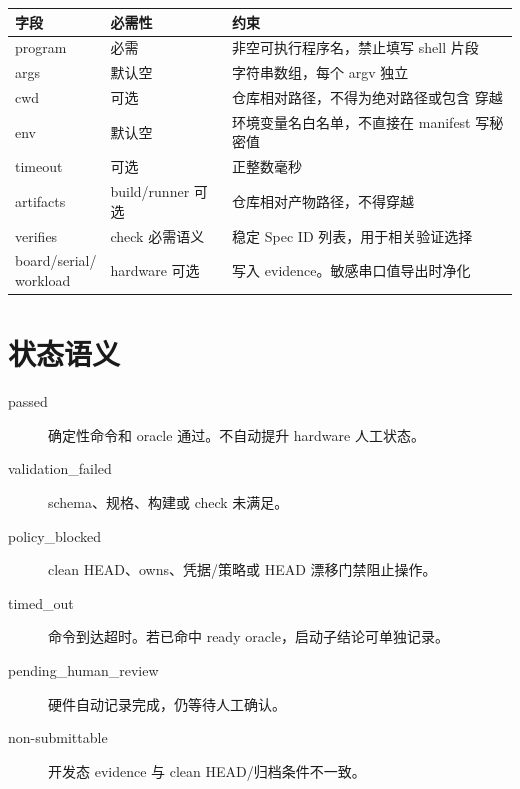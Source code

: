 \begin{table}[htbp]
  \centering
  \begin{tabularx}{\textwidth}{p{3.2cm}p{2.4cm}X}
    \toprule
    字段 & 必需性 & 约束 \\
    \midrule
    program & 必需 & 非空可执行程序名，禁止填写 shell 片段 \\
    args & 默认空 & 字符串数组，每个 argv 独立 \\
    cwd & 可选 & 仓库相对路径，不得为绝对路径或包含 \code{..} 穿越 \\
    env & 默认空 & 环境变量名白名单，不直接在 manifest 写秘密值 \\
    timeout & 可选 & 正整数毫秒 \\
    artifacts & build/runner 可选 & 仓库相对产物路径，不得穿越 \\
    verifies & check 必需语义 & 稳定 Spec ID 列表，用于相关验证选择 \\
    \makecell[l]{board/serial/\\workload} & hardware 可选 & 写入 evidence。敏感串口值导出时净化 \\
    \bottomrule
  \end{tabularx}
\end{table}

\section{状态语义}

\begin{description}
  \item[passed] 确定性命令和 oracle 通过。不自动提升 hardware 人工状态。
  \item[validation\_failed] schema、规格、构建或 check 未满足。
  \item[policy\_blocked] clean HEAD、owns、凭据/策略或 HEAD 漂移门禁阻止操作。
  \item[timed\_out] 命令到达超时。若已命中 ready oracle，启动子结论可单独记录。
  \item[pending\_human\_review] 硬件自动记录完成，仍等待人工确认。
  \item[non-submittable] 开发态 evidence 与 clean HEAD/归档条件不一致。
\end{description}
